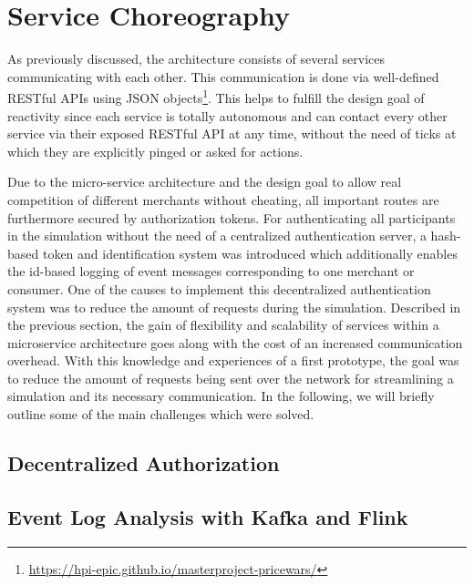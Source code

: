 %
\section{Service Choreography}
\label{sec:Choreography}
%
As previously discussed, the architecture consists of several services communicating with each other. This communication is done via well-defined RESTful APIs using JSON objects\footnote{\url{https://hpi-epic.github.io/masterproject-pricewars/}}. This helps to fulfill the design goal of reactivity since each service is totally autonomous and can contact every other service via their exposed RESTful API at any time, without the need of ticks at which they are explicitly pinged or asked for actions. 

Due to the micro-service architecture and the design goal to allow real competition of different merchants without cheating, all important routes are furthermore secured by authorization tokens. For authenticating all participants in the simulation without the need of a centralized authentication server, a hash-based token and identification system was introduced which additionally enables the id-based logging of event messages corresponding to one merchant or consumer. One of the causes to implement this decentralized authentication system was to reduce the amount of requests during the simulation. Described in the previous section, the gain of flexibility and scalability of services within a microservice architecture goes along with the cost of an increased communication overhead. With this knowledge and experiences of a first prototype, the goal was to reduce the amount of requests being sent over the network for streamlining a simulation and its necessary communication. 
In the following, we will briefly outline some of the main challenges which were solved.

%
\subsection{Decentralized Authorization}
\label{sec:DecentralizedAuthorization}
%

%
\subsection{Event Log Analysis with Kafka and Flink}
%


